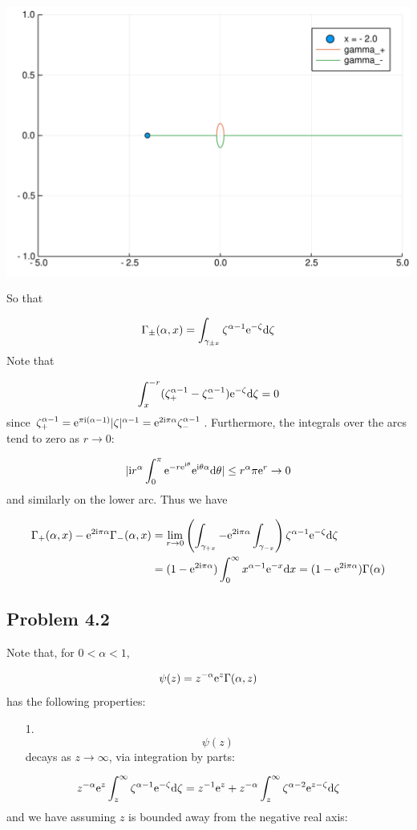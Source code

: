 \documentclass[12pt,a4paper]{article}
\def\D{ {\rm d} }
\def\I{ {\rm i} }
\def\E{ {\rm e} }
\def\addtab#1={#1\;&=}
\def\ccr{\\\addtab}
\def\dx{\D x}
\def\addtab#1={#1\;&=}
\def\ccr{\\\addtab}
\begin{document}
\includegraphics[width=\linewidth]{figures/Solutions3_7_1.pdf}

So that

\[
\Gamma_\pm(\alpha, x) = \int_{\gamma_{\pm x}} \zeta^{\alpha-1} \E^{-\zeta} \D \zeta
\]
Note that

\[
\int_x^{-r} (\zeta_+^{\alpha - 1} - \zeta_-^{\alpha -1}) \E^{-\zeta} \D\zeta = 0
\]
since $\zeta_+^{\alpha-1} = \E^{\pi \I (\alpha-1)}|\zeta|^{\alpha-1} = \E^{2 \I \pi \alpha} \zeta_-^{\alpha-1}$. Furthermore, the integrals over the arcs tend to zero as $r \rightarrow 0$:

\[
|\I r^\alpha \int_0^\pi \E^{- r \E^{\I \theta}} \E^{\I \theta \alpha} \D \theta  | \leq r^\alpha \pi \E^r  \rightarrow 0
\]
and similarly on the lower arc. Thus we have


\begin{align*}
\Gamma_+(\alpha, x)-\E^{2 \I \pi \alpha} \Gamma_-(\alpha, x) &= \lim_{r \rightarrow 0 } \left(\int_{\gamma_{+x}} - \E^{2 \I \pi \alpha} \int_{\gamma_{-x}}\right) \zeta^{\alpha-1} \E^{-\zeta} \D \zeta \ccr
 = (1 - \E^{2 \I \pi \alpha})\int_0^\infty x^{\alpha-1} \E^{-x} \dx = (1 - \E^{2 \I \pi \alpha})\Gamma(\alpha)
\end{align*}
\subsection{Problem 4.2}
Note that, for $0 < \alpha < 1$,

\[
    \psi(z) = z^{-\alpha} \E^z \Gamma(\alpha, z)
\]
has the following properties:

\begin{itemize}
\item[1. ] \[
\psi(z)
\]
decays as $z \rightarrow \infty$, via integration by parts:

\end{itemize}
\[
    z^{-\alpha} \E^z \int_z^\infty \zeta^{\alpha-1} \E^{-\zeta} \D \zeta =
    z^{-1} \E^z + z^{-\alpha} \int_z^\infty \zeta^{\alpha-2} \E^{z-\zeta} \D \zeta
\]
and we have assuming $z$ is bounded away from the negative real axis:
\end{document}
